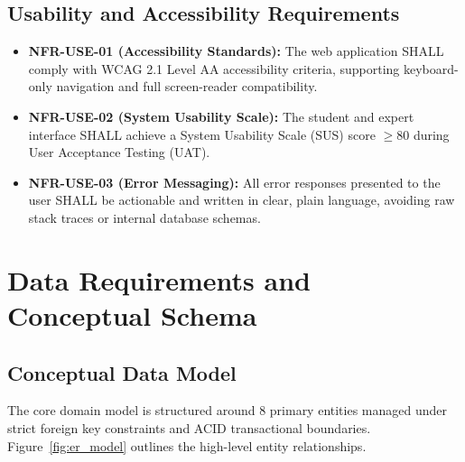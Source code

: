\documentclass[11pt,a4paper]{article}
\begin{document}
\subsection{Usability and Accessibility Requirements}
\begin{itemize}[noitemsep]
    \item \textbf{NFR-USE-01 (Accessibility Standards):} The web application SHALL comply with WCAG 2.1 Level AA accessibility criteria, supporting keyboard-only navigation and full screen-reader compatibility.
    \item \textbf{NFR-USE-02 (System Usability Scale):} The student and expert interface SHALL achieve a System Usability Scale (SUS) score $\ge 80$ during User Acceptance Testing (UAT).
    \item \textbf{NFR-USE-03 (Error Messaging):} All error responses presented to the user SHALL be actionable and written in clear, plain language, avoiding raw stack traces or internal database schemas.
\end{itemize}

\clearpage
\section{Data Requirements and Conceptual Schema}
\label{sec:data_reqs}

\subsection{Conceptual Data Model}
The core domain model is structured around 8 primary entities managed under strict foreign key constraints and ACID transactional boundaries. Figure~\ref{fig:er_model} outlines the high-level entity relationships.
\end{document}
